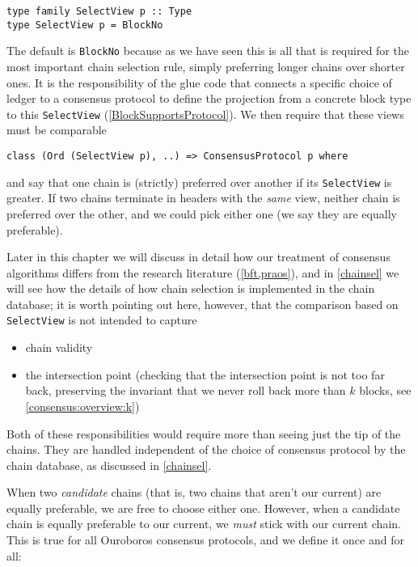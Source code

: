 \begin{lstlisting}
type family SelectView p :: Type
type SelectView p = BlockNo
\end{lstlisting}

The default is \lstinline!BlockNo! because as we have seen this is all that is
required for the most important chain selection rule, simply preferring longer
chains over shorter ones. It is the responsibility of the glue code that
connects a specific choice of ledger to a consensus protocol to define the
projection from a concrete block type to this \lstinline!SelectView!
(\ref{BlockSupportsProtocol}). We then require that these views must be
comparable
%
\begin{lstlisting}
class (Ord (SelectView p), ..) => ConsensusProtocol p where
\end{lstlisting}
%
and say that one chain is (strictly) preferred over another if its
\lstinline!SelectView! is greater. If two chains terminate in headers with
the \emph{same} view, neither chain is preferred over the other, and we
could pick either one (we say they are equally preferable).

Later in this chapter we will discuss in detail how our treatment of
consensus algorithms differs from the research literature (\cref{bft,praos}),
and in \cref{chainsel} we will see how the details of how chain selection
is implemented in the chain database; it is worth pointing out here, however, that the comparison based on \lstinline!SelectView! is not intended to capture

\begin{itemize}
\item chain validity
\item the intersection point (checking that the intersection point is not too
far back, preserving the invariant that we never roll back more than $k$ blocks,
see \cref{consensus:overview:k})
\end{itemize}

Both of these responsibilities would require more than seeing just
the tip of the chains. They are handled independent of the choice of
consensus protocol by the chain database, as discussed in \cref{chainsel}.

When two \emph{candidate} chains (that is, two chains that aren't our current)
are equally preferable, we are free to choose either one. However, when a
candidate chain is equally preferable to our current, we \emph{must} stick
with our current chain. This is true for all Ouroboros consensus protocols,
and we define it once and for all:

